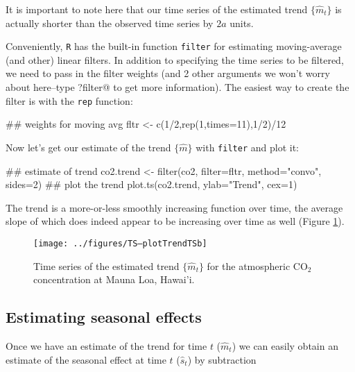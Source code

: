 \noindent It is important to note here that our time series of the estimated trend $\{\hat{m}_t\}$ is actually shorter than the observed time series by $2a$ units.

Conveniently, \texttt{R} has the built-in function \texttt{filter} for estimating moving-average (and other) linear filters.  In addition to specifying the time series to be filtered, we need to pass in the filter weights (and 2 other arguments we won't worry about here--type \verb@?filter@ to get more information).  The easiest way to create the filter is with the \texttt{rep} function:

\begin{Schunk}
\begin{Sinput}
 ## weights for moving avg
 fltr <- c(1/2,rep(1,times=11),1/2)/12
\end{Sinput}
\end{Schunk}

Now let's get our estimate of the trend $\{\hat{m}\}$ with \texttt{filter} and plot it:

\begin{Schunk}
\begin{Sinput}
 ## estimate of trend
 co2.trend <- filter(co2, filter=fltr, method="convo", sides=2)
 ## plot the trend
 plot.ts(co2.trend, ylab="Trend", cex=1)
\end{Sinput}
\end{Schunk}

\noindent The trend is a more-or-less smoothly increasing function over time, the average slope of which does indeed appear to be increasing over time as well (Figure \ref{fig:LW1.figTrendTS}).

\begin{figure}[htp]
\begin{center}
\texttt{[image: ../figures/TS--plotTrendTSb]}
\end{center}
\caption{Time series of the estimated trend $\{\hat{m}_t\}$ for the atmospheric CO$_2$ concentration at Mauna Loa, Hawai'i.}
\label{fig:LW1.figTrendTS}
\end{figure}

\subsection{Estimating seasonal effects}

Once we have an estimate of the trend for time $t$ ($\hat{m}_t$) we can easily obtain an estimate of the seasonal effect at time $t$ ($\hat{s}_t$) by subtraction

